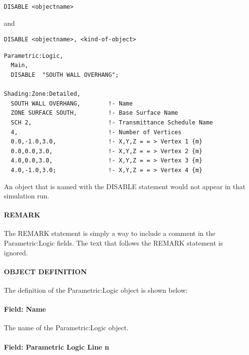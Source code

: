 \begin{lstlisting}
DISABLE <objectname>
\end{lstlisting}

and

\begin{lstlisting}
DISABLE <objectname>, <kind-of-object>
\end{lstlisting}

\begin{lstlisting}
Parametric:Logic,
  Main,
  DISABLE  "SOUTH WALL OVERHANG";

Shading:Zone:Detailed,
  SOUTH WALL OVERHANG,        !- Name
  ZONE SURFACE SOUTH,         !- Base Surface Name
  SCH 2,                      !- Transmittance Schedule Name
  4,                          !- Number of Vertices
  0.0,-1.0,3.0,               !- X,Y,Z = = > Vertex 1 {m}
  0.0,0.0,3.0,                !- X,Y,Z = = > Vertex 2 {m}
  4.0,0.0,3.0,                !- X,Y,Z = = > Vertex 3 {m}
  4.0,-1.0,3.0;               !- X,Y,Z = = > Vertex 4 {m}
\end{lstlisting}

An object that is named with the DISABLE statement would not appear in that simulation run.

\paragraph{REMARK}\label{remark}

The REMARK statement is simply a way to include a comment in the Parametric:Logic fields. The text that follows the REMARK statement is ignored.

\paragraph{OBJECT DEFINITION}\label{object-definition}

The definition of the Parametric:Logic object is shown below:

\paragraph{Field: Name}\label{field-name-029}

The name of the Parametric:Logic object.

\paragraph{Field: Parametric Logic Line n}\label{field-parametric-logic-line-n}

